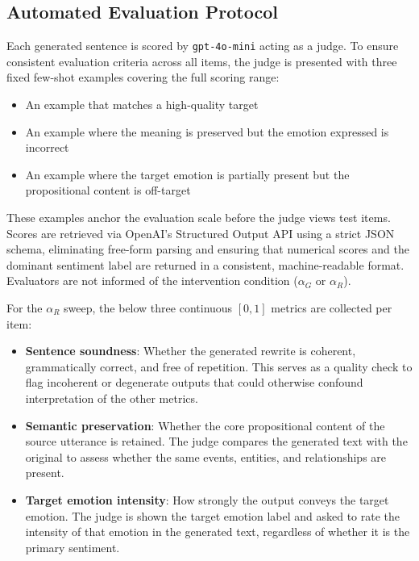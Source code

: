 \subsection{Automated Evaluation Protocol}

Each generated sentence is scored by \texttt{gpt-4o-mini} acting as a judge. To ensure consistent evaluation criteria across all items, the judge is presented with three fixed few-shot examples covering the full scoring range:

\begin{itemize}
  \item An example that matches a high-quality target
  \item An example where the meaning is preserved but the emotion expressed is incorrect
  \item An example where the target emotion is partially present but the propositional content is off-target
\end{itemize}

These examples anchor the evaluation scale before the judge views test items. Scores are retrieved via OpenAI's Structured Output API using a strict JSON schema, eliminating free-form parsing and ensuring that numerical scores and the dominant sentiment label are returned in a consistent, machine-readable format. Evaluators are not informed of the intervention condition ($\alpha_G$ or $\alpha_R$).\par

For the $\alpha_R$ sweep, the below three continuous $[0,1]$ metrics are collected per item:
\begin{itemize}
  \item \textbf{Sentence soundness}: Whether the generated rewrite is coherent, grammatically correct, and free of repetition. This serves as a quality check to flag incoherent or degenerate outputs that could otherwise confound interpretation of the other metrics.
  \item \textbf{Semantic preservation}: Whether the core propositional content of the source utterance is retained. The judge compares the generated text with the original to assess whether the same events, entities, and relationships are present.
  \item \textbf{Target emotion intensity}: How strongly the output conveys the target emotion. The judge is shown the target emotion label and asked to rate the intensity of that emotion in the generated text, regardless of whether it is the primary sentiment.
\end{itemize}

